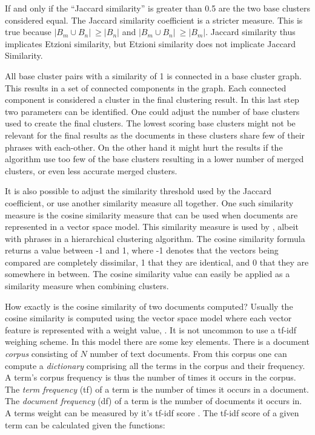 If and only if the ``Jaccard similarity'' is greater than 0.5 are the two base clusters considered equal. The Jaccard similarity coefficient is a stricter measure. This is true because \(\vert B_{m} \cup B_{n} \vert\ \geq \vert B_{n} \vert\) and \(\vert B_{m} \cup B_{n} \vert\ \geq \vert B_{m} \vert\). Jaccard similarity thus implicates Etzioni similarity, but Etzioni similarity does not implicate Jaccard Similarity.

All base cluster pairs with a similarity of 1 is connected in a base cluster graph. This results in a set of connected components in the graph. Each connected component is considered a cluster in the final clustering result. In this last step two parameters can be identified. One could adjust the number of base clusters used to create the final clusters. The lowest scoring base clusters might not be relevant for the final results as the documents in these clusters share few of their phrases with each-other. On the other hand it might hurt the results if the algorithm use too few of the base clusters resulting in a lower number of merged clusters, or even less accurate merged clusters.

It is also possible to adjust the similarity threshold used by the Jaccard coefficient, or use another similarity measure all together. One such similarity measure is the cosine similarity measure that can be used when documents are represented in a vector space model. This similarity measure is used by \cite{Chim2007}, albeit with phrases in a hierarchical clustering algorithm. The cosine similarity formula returns a value between -1 and 1, where -1 denotes that the vectors being compared are completely dissimilar, 1 that they are identical, and 0 that they are somewhere in between. The cosine similarity value can easily be applied as a similarity measure when combining clusters.

How exactly is the cosine similarity of two documents computed? Usually the cosine similarity is computed using the vector space model where each vector feature is represented with a weight value, \cite{Manning2009a}. It is not uncommon to use a tf-idf weighing scheme. In this model there are some key elements. There is a document \textit{corpus} consisting of \(N\) number of text documents. From this corpus one can compute a \textit{dictionary} comprising all the terms in the corpus and their frequency. A term's corpus frequency is thus the number of times it occurs in the corpus. The \textit{term frequency} (tf) of a term is the number of times it occurs in a document. The \textit{document frequency} (df) of a term is the number of documents it occurs in. A terms weight can be measured by it's tf-idf score \cite{Manning2009a}. The tf-idf score of a given term can be calculated given the functions:


